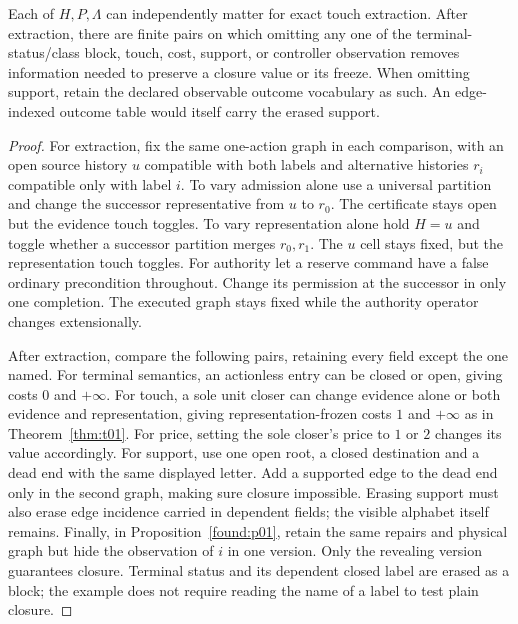\begin{proposition}\label{found:p02}

Each of \(H,P,\Lambda\) can independently matter for exact touch extraction. After extraction, there are finite pairs on which omitting any one of the terminal-status/class block, touch, cost, support, or controller observation removes information needed to preserve a closure value or its freeze. When omitting support, retain the declared observable outcome vocabulary as such. An edge-indexed outcome table would itself carry the erased support.

\end{proposition}

\begin{proof}

For extraction, fix the same one-action graph in each comparison, with an open source history \(u\) compatible with both labels and alternative histories \(r_i\) compatible only with label \(i\). To vary admission alone use a universal partition and change the successor representative from \(u\) to \(r_0\). The certificate stays open but the evidence touch toggles. To vary representation alone hold \(H=u\) and toggle whether a successor partition merges \(r_0,r_1\). The \(u\) cell stays fixed, but the representation touch toggles. For authority let a reserve command have a false ordinary precondition throughout. Change its permission at the successor in only one completion. The executed graph stays fixed while the authority operator changes extensionally.

After extraction, compare the following pairs, retaining every field except the one named. For terminal semantics, an actionless entry can be closed or open, giving costs \(0\) and \(+\infty\). For touch, a sole unit closer can change evidence alone or both evidence and representation, giving representation-frozen costs \(1\) and \(+\infty\) as in Theorem~\ref{thm:t01}. For price, setting the sole closer's price to \(1\) or \(2\) changes its value accordingly. For support, use one open root, a closed destination and a dead end with the same displayed letter. Add a supported edge to the dead end only in the second graph, making sure closure impossible. Erasing support must also erase edge incidence carried in dependent fields; the visible alphabet itself remains. Finally, in Proposition~\ref{found:p01}, retain the same repairs and physical graph but hide the observation of \(i\) in one version. Only the revealing version guarantees closure. Terminal status and its dependent closed label are erased as a block; the example does not require reading the name of a label to test plain closure.

\end{proof}

